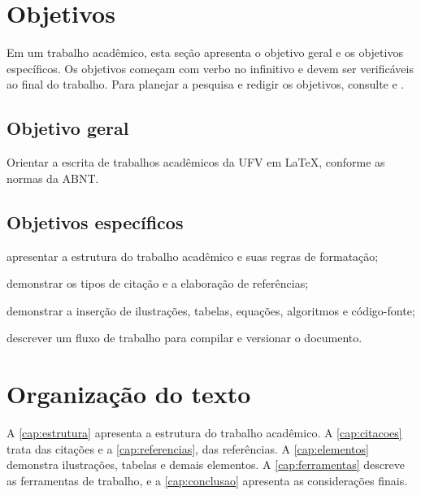 \section{Objetivos}\label{sec:objetivos}

Em um trabalho acadêmico, esta seção apresenta o objetivo geral e os objetivos específicos. Os objetivos começam com verbo no infinitivo e devem ser verificáveis ao final do trabalho. Para planejar a pesquisa e redigir os objetivos, consulte  e .

\subsection{Objetivo geral}\label{sec:objetivo-geral}

Orientar a escrita de trabalhos acadêmicos da UFV em \LaTeX, conforme as normas da ABNT.

\subsection{Objetivos específicos}\label{sec:objetivos-especificos}

\begin{alineas}
	\item apresentar a estrutura do trabalho acadêmico e suas regras de formatação;
	\item demonstrar os tipos de citação e a elaboração de referências;
	\item demonstrar a inserção de ilustrações, tabelas, equações, algoritmos e código-fonte;
	\item descrever um fluxo de trabalho para compilar e versionar o documento.
\end{alineas}

\section{Organização do texto}\label{sec:organizacao}

A \autoref{cap:estrutura} apresenta a estrutura do trabalho acadêmico. A \autoref{cap:citacoes} trata das citações e a \autoref{cap:referencias}, das referências. A \autoref{cap:elementos} demonstra ilustrações, tabelas e demais elementos. A \autoref{cap:ferramentas} descreve as ferramentas de trabalho, e a \autoref{cap:conclusao} apresenta as considerações finais.
